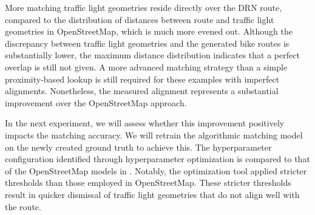 More matching traffic light geometries reside directly over the DRN route, compared to the distribution of distances between route and traffic light geometries in OpenStreetMap, which is much more evened out. Although the discrepancy between traffic light geometries and the generated bike routes is substantially lower, the maximum distance distribution indicates that a perfect overlap is still not given. A more advanced matching strategy than a simple proximity-based lookup is still required for these examples with imperfect alignments. Nonetheless, the measured alignment represents a substantial improvement over the OpenStreetMap approach. 

\begin{table}[b]
\caption{Retrained model thresholds on the new routing.}
\label{tab:hyperparameter-tuning-results-drn}
\end{table}

In the next experiment, we will assess whether this improvement positively impacts the matching accuracy. We will retrain the algorithmic matching model on the newly created ground truth to achieve this. The hyperparameter configuration identified through hyperparameter optimization is compared to that of the OpenStreetMap models in . Notably, the optimization tool applied stricter thresholds than those employed in OpenStreetMap. These stricter thresholds result in quicker dismissal of traffic light geometries that do not align well with the route.

